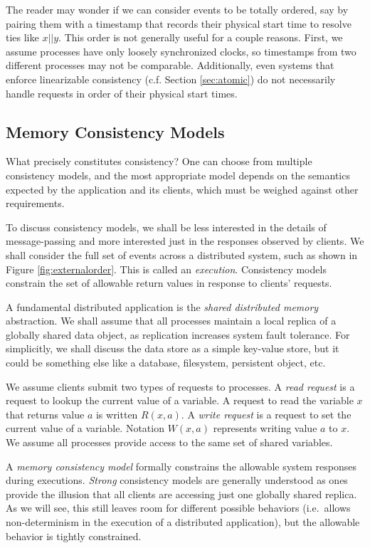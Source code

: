 \documentclass[]             %
{NASA}                       %
\theoremstyle{definition}
\begin{document}
The reader may wonder if we can consider events to be totally ordered,
say by pairing them with a timestamp that records their physical start
time to resolve ties like \(x || y\). This order is not generally useful
for a couple reasons. First, we assume processes have only loosely
synchronized clocks, so timestamps from two different processes may not
be comparable. Additionally, even systems that enforce linearizable
consistency (c.f. Section \ref{sec:atomic}) do not necessarily handle
requests in order of their physical start times.

\subsection{Memory Consistency Models}\label{memory-consistency-models}

\label{sec:atomic}

What precisely constitutes consistency? One can choose from multiple
consistency models, and the most appropriate model depends on the
semantics expected by the application and its clients, which must be
weighed against other requirements.

To discuss consistency models, we shall be less interested in the
details of message-passing and more interested just in the responses
observed by clients. We shall consider the full set of events across a
distributed system, such as shown in Figure \ref{fig:externalorder}.
This is called an \emph{execution}. Consistency models constrain the set
of allowable return values in response to clients' requests.

A fundamental distributed application is the \emph{shared distributed
memory} abstraction. We shall assume that all processes maintain a local
replica of a globally shared data object, as replication increases
system fault tolerance. For simplicitly, we shall discuss the data store
as a simple key-value store, but it could be something else like a
database, filesystem, persistent object, etc.

We assume clients submit two types of requests to processes. A
\emph{read request} is a request to lookup the current value of a
variable. A request to read the variable \(x\) that returns value \(a\)
is written \(R(x,a)\). A \emph{write request} is a request to set the
current value of a variable. Notation \(W(x,a)\) represents writing
value \(a\) to \(x\). We assume all processes provide access to the same
set of shared variables.

A \emph{memory consistency model} formally constrains the allowable
system responses during executions. \emph{Strong} consistency models are
generally understood as ones provide the illusion that all clients are
accessing just one globally shared replica. As we will see, this still
leaves room for different possible behaviors (i.e.~allows
non-determinism in the execution of a distributed application), but the
allowable behavior is tightly constrained.
\end{document}
